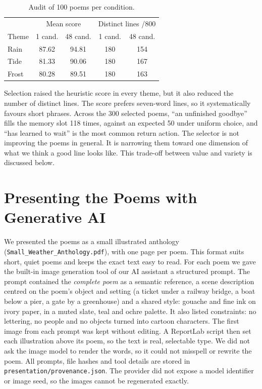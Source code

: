 \documentclass[letterpaper]{article}
\newcommand{\code}[1]{\texttt{\small #1}}
\begin{document}
\begin{table}[h]
\centering\small
\begin{tabular}{lcccc}
\toprule
 & \multicolumn{2}{c}{Mean score} & \multicolumn{2}{c}{Distinct lines /800}\\
Theme & 1 cand. & 48 cand. & 1 cand. & 48 cand.\\
\midrule
Rain  & 87.62 & 94.81 & 180 & 154\\
Tide  & 81.33 & 90.06 & 180 & 167\\
Frost & 80.28 & 89.51 & 180 & 163\\
\bottomrule
\end{tabular}
\caption{Audit of 100 poems per condition.}
\label{tab:audit}
\end{table}

Selection raised the heuristic score in every theme, but it also reduced
the number of distinct lines. The score prefers seven-word lines, so it
systematically favours short phrases. Across the 300 selected poems,
``an unfinished goodbye'' fills the memory slot 118 times, against an
expected 50 under uniform choice, and ``has learned to wait'' is the
most common return action. The selector is not improving the poems in
general. It is narrowing them toward one dimension of what we think a
good line looks like. This trade-off between value and variety is
discussed below.

\section{Presenting the Poems with Generative AI}
We presented the poems as a small illustrated anthology
(\code{Small\_Weather\_Anthology.pdf}), with one page per poem. This
format suits short, quiet poems and keeps the exact text easy to read.
For each poem we gave the built-in image generation tool of our AI
assistant a structured prompt. The prompt contained the \emph{complete
poem} as a semantic reference, a scene description centred on the
poem's object and setting (a ticket under a railway bridge, a boat
below a pier, a gate by a greenhouse) and a shared style: gouache and
fine ink on ivory paper, in a muted slate, teal and ochre palette. It
also listed constraints: no lettering, no people and no objects turned
into cartoon characters. The first image from each prompt was kept
without editing. A ReportLab script then set each illustration above
its poem, so the text is real, selectable type. We did not ask the
image model to render the words, so it could not misspell or rewrite
the poem. All prompts, file hashes and tool details are stored in
\code{presentation/provenance.json}. The provider did not expose a
model identifier or image seed, so the images cannot be regenerated
exactly.
\end{document}
